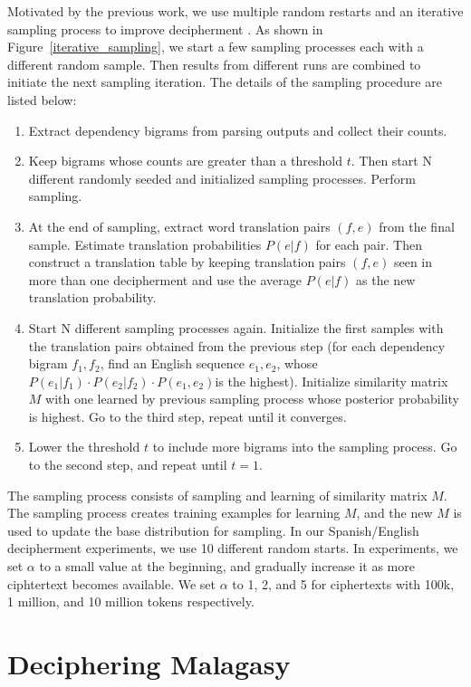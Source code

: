 Motivated by the previous work, we use multiple random restarts and an iterative sampling process to improve decipherment \cite{Dou:2012}. As shown in Figure~\ref{iterative_sampling}, we start a few sampling processes each with a different random sample. Then results from different runs are combined to initiate the next sampling iteration. The details of the sampling procedure are listed below:

 \begin{enumerate}
  \item Extract dependency bigrams from parsing outputs and collect their counts.
  \item Keep bigrams whose counts are greater than a threshold $t$. Then start N different randomly seeded and initialized sampling processes. Perform sampling.
  \item At the end of sampling, extract word translation pairs $(f,e)$ from the final sample. Estimate translation probabilities $P(e|f)$ for each pair. Then construct a translation table by keeping translation pairs $(f,e)$ seen in more than one decipherment and use the average $P(e|f)$ as the new translation probability.
  \item Start N different sampling processes again. Initialize the first samples with the translation pairs obtained from the previous step (for each dependency bigram $f_{1},f_{2}$, find an English sequence $e_{1},e_{2}$, whose $P(e_{1}|f_{1})\cdot P(e_{2}|f_{2})\cdot P(e_{1},e_{2})$is the highest). Initialize similarity matrix $M$ with one learned by previous sampling process whose posterior probability is highest. Go to the third step, repeat until it converges.
  \item Lower the threshold $t$ to include more bigrams into the sampling process. Go to the second step, and repeat until $t=1$.
 \end{enumerate}

The sampling process consists of sampling and learning of similarity matrix $M$. The sampling process creates training examples for learning $M$, and the new $M$ is used to update the base distribution for sampling. In our Spanish/English decipherment experiments, we use 10 different random starts. In experiments, we set $\alpha$ to a small value at the beginning, and gradually increase it as more ciphtertext becomes available. We set $\alpha$ to 1, 2, and 5 for ciphertexts with 100k, 1 million, and 10 million tokens respectively. 

\section{Deciphering Malagasy}
\label{decipher_malagasy}

